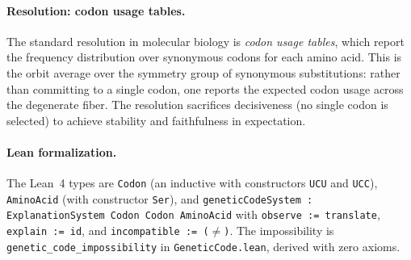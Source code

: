 \paragraph{Resolution: codon usage tables.}
The standard resolution in molecular biology is \emph{codon usage tables},
which report the frequency distribution over synonymous codons for each amino
acid.  This is the orbit average over the symmetry group of synonymous
substitutions: rather than committing to a single codon, one reports the
expected codon usage across the degenerate fiber.  The resolution sacrifices
decisiveness (no single codon is selected) to achieve stability and
faithfulness in expectation.

\paragraph{Lean formalization.}
The Lean~4 types are \texttt{Codon} (an inductive with constructors
\texttt{UCU} and \texttt{UCC}), \texttt{AminoAcid} (with constructor
\texttt{Ser}), and \texttt{geneticCodeSystem : ExplanationSystem Codon Codon
AminoAcid} with \texttt{observe := translate}, \texttt{explain := id}, and
\texttt{incompatible := ($\ne$)}.
The impossibility is \texttt{genetic\_code\_impossibility} in
\texttt{GeneticCode.lean}, derived with zero axioms.

